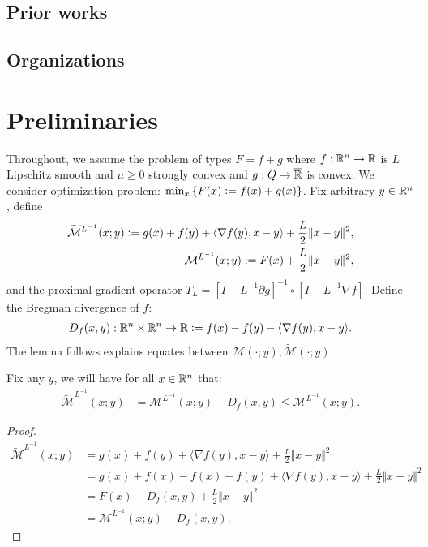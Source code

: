 \documentclass[12pt]{article}
\begin{document}
    \subsection{Prior works}
        
    \subsection{Organizations}

    
       

\section{Preliminaries}
    Throughout, we assume the problem of types $F = f + g$ where $f: \mathbb R^n \rightarrow \mathbb R$ is $L$ Lipschitz smooth and $\mu \ge 0$ strongly convex and $g: Q \rightarrow \overline {\mathbb R}$ is convex. 
    We consider optimization problem: $\min_x \left\lbrace F(x) \vcentcolon= f(x) + g(x)\right\rbrace$.
    Fix arbitrary $y \in \mathbb R^n$, define
    \begin{align*}
        \widetilde{\mathcal M}^{L^{-1}}
        (x; y) \vcentcolon=
        g(x) + f(y) + \langle \nabla f(y), x - y\rangle 
        + \frac{L}{2}\Vert x - y\Vert^2, 
        \\
        \mathcal M^{L^{-1}}(x; y) := F(x) + \frac{L}{2}\Vert x - y\Vert^2, 
    \end{align*}
    and the proximal gradient operator $T_L = [I + L^{-1}\partial g]^{-1}\circ [I - L^{-1}\nabla f]$. 
    Define the Bregman divergence of $f$: 
    \begin{align*}
        D_f(x, y): \mathbb R^n \times \mathbb R^n \rightarrow \mathbb R 
        \vcentcolon= f(x) - f(y) - \langle \nabla f(y), x - y\rangle. 
    \end{align*}
    The lemma follows explains equates between $\mathcal M(\cdot; y), \widetilde{\mathcal M}(\cdot; y)$. 
    \begin{lemma} 
        Fix any $y$, we will have for all $x \in \mathbb R^n$ that: 
        \begin{align*}
            \widetilde{\mathcal M}^{L^{-1}}(x; y)
            &= 
            \mathcal M^{L^{-1}}(x; y)- D_f(x, y) \le \mathcal M^{L^{-1}}(x; y). 
        \end{align*}
    \end{lemma}
    \begin{proof}
        \begin{align*}
            \widetilde{\mathcal M}^{L^{-1}}(x; y) 
            &= 
            g(x) + f(y) + \langle \nabla f(y), x - y\rangle + \frac{L}{2}\Vert x - y\Vert^2
            \\
            &= 
            g(x) + f(x) - f(x) + f(y) 
            + \langle \nabla f(y), x - y\rangle + \frac{L}{2}\Vert x - y\Vert^2
            \\
            &= 
            F(x) - D_f(x, y) + \frac{L}{2}\Vert x - y\Vert^2 
            \\
            &= \mathcal M^{L^{-1}}(x; y) - D_f(x, y). 
        \end{align*}
    \end{proof}
\end{document}
